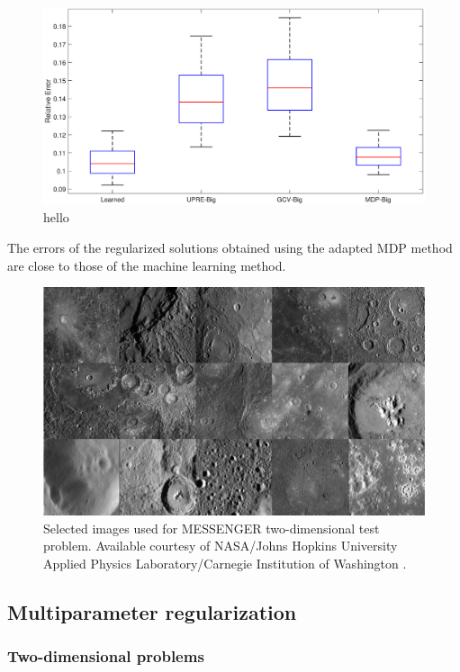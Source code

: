 \documentclass[12pt]{article}
\begin{document}
\begin{figure}[ht]
\includegraphics[scale=0.36]{Figures/Errors2D_mri}
\caption{hello}
\label{fig:Errors 2D}
\end{figure}
The errors of the regularized solutions obtained using the adapted MDP method are close to those of the machine learning method.

\begin{figure}
\label{fig:MESSENGER True}
\includegraphics[scale=0.36]{Figures/MESSENGER}
\caption{Selected images used for MESSENGER two-dimensional test problem. Available courtesy of NASA/Johns  Hopkins  University  Applied  Physics  Laboratory/Carnegie Institution of Washington \cite{MESSENGER}.}
\end{figure}

\subsection{Multiparameter regularization}

\subsubsection{Two-dimensional problems}
\end{document}

